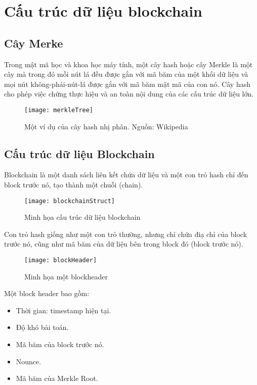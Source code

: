 \chapter{Cấu trúc dữ liệu blockchain}

\section{Cây Merke}

%
%

Trong mật mã học và khoa học máy tính, một cây hash hoặc cây Merkle là một cây mà trong đó mỗi nút lá đều được gắn với mã băm của một khối dữ liệu và mọi nút không-phải-nút-lá được gắn với mã băm mật mã của con nó. Cây hash cho phép việc chứng thực hiệu và an toàn nội dung của các cấu trúc dữ liệu lớn.

\begin{figure}[h]
	\centering
	\texttt{[image: merkleTree]}
	\caption{Một ví dụ của cây hash nhị phân. Nguồn: Wikipedia}
	
\end{figure}

\section{Cấu trúc dữ liệu Blockchain}
Blockchain là một danh sách liên kết chứa dữ liệu và một con trỏ hash chỉ đến block trước nó, tạo thành một chuỗi (chain).

\begin{figure}[h]
	\centering
	\texttt{[image: blockchainStruct]}
	\caption{Minh họa cấu trúc dữ liệu blockchain}
	
\end{figure}

Con trỏ hash giống như một con trỏ thường, nhưng chỉ chứa điạ chỉ của block trước nó, cũng như mã băm của dữ liệu bên trong block đó (block trước nó).

\begin{figure}[h]
	\centering
	\texttt{[image: blockHeader]}
	\caption{Minh họa một blockheader}

\end{figure}

Một block header bao gồm:
\begin{itemize}
	\item Thời gian: timestamp hiện tại.
\item Độ khó bài toán.
\item Mã băm của block trước nó.
\item Nounce.
\item Mã băm của Merkle Root.
\end{itemize}

